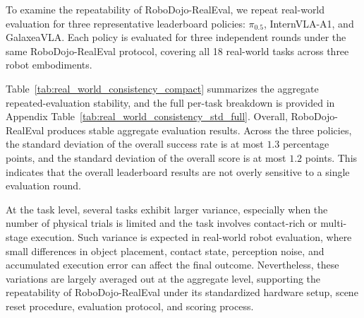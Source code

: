 

To examine the repeatability of RoboDojo-RealEval, we repeat real-world evaluation for three representative leaderboard policies: $\pi_{0.5}$, InternVLA-A1, and GalaxeaVLA. Each policy is evaluated for three independent rounds under the same RoboDojo-RealEval protocol, covering all 18 real-world tasks across three robot embodiments.

Table~\ref{tab:real_world_consistency_compact} summarizes the aggregate repeated-evaluation stability, and the full per-task breakdown is provided in Appendix Table~\ref{tab:real_world_consistency_std_full}. Overall, RoboDojo-RealEval produces stable aggregate evaluation results. Across the three policies, the standard deviation of the overall success rate is at most $1.3$ percentage points, and the standard deviation of the overall score is at most $1.2$ points. This indicates that the overall leaderboard results are not overly sensitive to a single evaluation round.

At the task level, several tasks exhibit larger variance, especially when the number of physical trials is limited and the task involves contact-rich or multi-stage execution. Such variance is expected in real-world robot evaluation, where small differences in object placement, contact state, perception noise, and accumulated execution error can affect the final outcome. Nevertheless, these variations are largely averaged out at the aggregate level, supporting the repeatability of RoboDojo-RealEval under its standardized hardware setup, scene reset procedure, evaluation protocol, and scoring process.